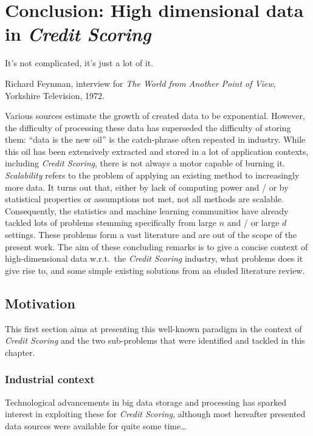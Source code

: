 \chapter*{Conclusion: High dimensional data in \textit{Credit Scoring}} \label{ccl}


\epigraph{It's not complicated, it's just a lot of it.}{Richard Feynman, interview for \textit{The World from Another Point of View}, Yorkshire Television, 1972.}

\minitoc

Various sources estimate the growth of created data to be exponential. However, the difficulty of processing these data has superseded the difficulty of storing them: ``data is the new oil'' is the catch-phrase often repeated in industry. While this oil has been extensively extracted and stored in a lot of application contexts, including \textit{Credit Scoring}, there is not always a motor capable of burning it. \textit{Scalability} refers to the problem of applying an existing method to increasingly more data. It turns out that, either by lack of computing power and / or by statistical properties or assumptions not met, not all methods are scalable.
Consequently, the statistics and machine learning communities have already tackled lots of problems stemming specifically from large $n$ and / or large $d$ settings.
These problems form a vast literature and are out of the scope of the present work.
The aim of these concluding remarks is to give a concise context of high-dimensional data w.r.t.\ the \textit{Credit Scoring} industry, what problems does it give rise to, and some simple existing solutions from an eluded literature review.

\section{Motivation}

This first section aims at presenting this well-known paradigm in the context of \textit{Credit Scoring} and the two sub-problems that were identified and tackled in this chapter.

\subsection{Industrial context}

Technological advancements in big data storage and processing has sparked interest in exploiting these for \textit{Credit Scoring}, although most hereafter presented data sources were available for quite some time\dots

